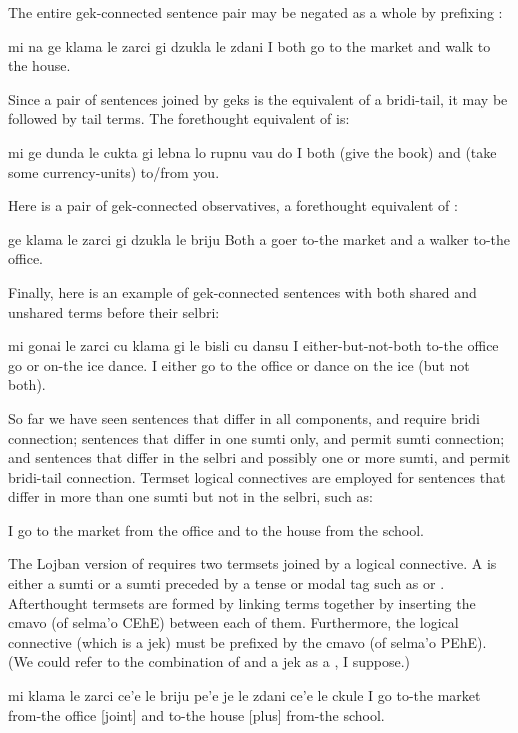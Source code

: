 The entire gek-connected sentence pair may be negated as a
    whole by prefixing :
\begin{example}
mi na ge klama le zarci gi dzukla le zdani\n
{} I both go to the market and walk to the house.
\end{example}

Since a pair of sentences joined by geks is the equivalent of a
    bridi-tail, it may be followed by tail terms. The forethought
    equivalent of  is:
\begin{example}
mi ge dunda le cukta\n
\T	gi lebna lo rupnu vau do\n
I both (give the book)\n
\T	and (take some currency-units) to/from you.
\end{example}

Here is a pair of gek-connected observatives, a forethought
    equivalent of :
\begin{example}
ge klama le zarci gi dzukla le briju\n
Both a goer to-the market and a walker to-the office.
\end{example}

Finally, here is an example of gek-connected sentences with
    both shared and unshared terms before their selbri:
\begin{example}
mi gonai le zarci cu klama\n
\T	gi le bisli cu dansu\n
I either-but-not-both to-the office go\n
\T	or on-the ice dance.\n
I either go to the office or dance on the ice\n
\T	(but not both).
\end{example}



So far we have seen sentences that differ in all components,
    and require bridi connection; sentences that differ in one
    sumti only, and permit sumti connection; and sentences that
    differ in the selbri and possibly one or more sumti, and permit
    bridi-tail connection. Termset logical connectives are employed
    for sentences that differ in more than one sumti but not in the
    selbri, such as:
\begin{example}
I go to the market from the office\n
\T	and to the house from the school.
\end{example}

The Lojban version of 
    requires two termsets joined by a logical connective. A
     is either a sumti or a sumti preceded by a tense or
    modal tag such as  or . Afterthought termsets are
    formed by linking terms together by inserting the cmavo
     (of selma'o CEhE) between each of them. Furthermore,
    the logical connective (which is a jek) must be prefixed by the
    cmavo  (of selma'o PEhE). (We could refer to the
    combination of  and a jek as a , I suppose.)
\begin{example}
mi klama le zarci ce'e le briju pe'e je\n
\T	le zdani ce'e le ckule\n
I go to-the market  from-the office [joint] and\n
\T	to-the house [plus] from-the school.
\end{example}

